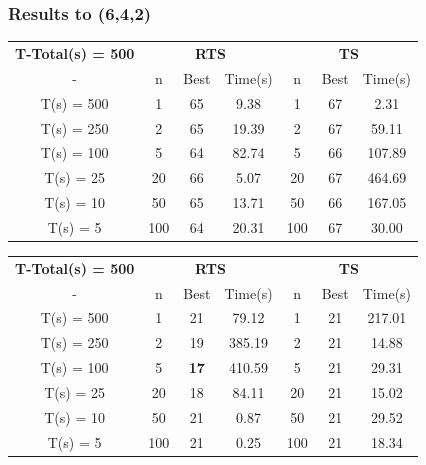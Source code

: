 \documentclass{beamer}
\begin{document}
\begin{frame}
  \frametitle{Results to (6,4,2)}
{
\tiny

\begin{table}
\begin{tabular}{c|c|c|c|c|c|c}  
\addlinespace
  \toprule
\multicolumn{7}{c}{{\bf $K_{4}(6,2) \leq 52$}} \\
 \midrule
\textbf{T-Total(s) = 500} & \multicolumn{3}{|c}{\textbf{RTS}} & \multicolumn{3}{|c}{\textbf{TS}} \\
 \midrule 
-        & n & Best & Time(s) & n & Best & Time(s) \\
 \midrule 
T(s) = 500 & 1  & 65    & 9.38       & 1  & 67    & 2.31      \\
T(s) = 250 & 2  & 65    & 19.39       & 2  & 67    & 59.11      \\
T(s) = 100 & 5  & 64    & 82.74       & 5  & 66    & 107.89      \\
T(s) = 25 & 20  & 66    & 5.07       & 20  & 67    & 464.69      \\
T(s) = 10 & 50  & 65    & 13.71       & 50  & 66    & 167.05      \\
T(s) = 5 & 100  & 64    & 20.31       & 100  & 67    & 30.00      \\
\bottomrule  
\end{tabular}
\label{tabela-K(642)}
\end{table}


\begin{table}
\begin{tabular}{c|c|c|c|c|c|c}  
\addlinespace
  \toprule
\multicolumn{7}{c}{{\bf $c_{4}(6,2) \leq 21$}} \\
 \midrule
\textbf{T-Total(s) = 500} & \multicolumn{3}{|c}{\textbf{RTS}} & \multicolumn{3}{|c}{\textbf{TS}} \\
 \midrule 
-        & n & Best & Time(s) & n & Best & Time(s) \\
 \midrule 
T(s) = 500 & 1  & 21    & 79.12       & 1  & 21    & 217.01      \\
T(s) = 250 & 2  & 19    & 385.19       & 2  & 21    & 14.88      \\
T(s) = 100 & 5  & \textbf{17}    & 410.59       & 5  & 21    & 29.31      \\
T(s) = 25 & 20  & 18    & 84.11       & 20  & 21    & 15.02      \\
T(s) = 10 & 50  & 21    & 0.87       & 50  & 21    & 29.52      \\
T(s) = 5 & 100  & 21    & 0.25       & 100  & 21    & 18.34      \\
\bottomrule  
\end{tabular}
\label{tabela-c(642)}
\end{table}

}

\end{frame}
\end{document}
